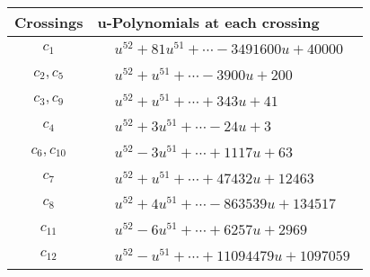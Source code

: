 \documentclass[1p]{elsarticle_modified}
\theoremstyle{definition}
\begin{document}
\begin{tabular}{m{50pt}|m{274pt}}
Crossings & \hspace{64pt}u-Polynomials at each crossing \\
\hline $$\begin{aligned}c_{1}\end{aligned}$$&$\begin{aligned}
&u^{52}+81 u^{51}+\cdots-3491600 u+40000
\end{aligned}$\\
\hline $$\begin{aligned}c_{2},c_{5}\end{aligned}$$&$\begin{aligned}
&u^{52}+u^{51}+\cdots-3900 u+200
\end{aligned}$\\
\hline $$\begin{aligned}c_{3},c_{9}\end{aligned}$$&$\begin{aligned}
&u^{52}+u^{51}+\cdots+343 u+41
\end{aligned}$\\
\hline $$\begin{aligned}c_{4}\end{aligned}$$&$\begin{aligned}
&u^{52}+3 u^{51}+\cdots-24 u+3
\end{aligned}$\\
\hline $$\begin{aligned}c_{6},c_{10}\end{aligned}$$&$\begin{aligned}
&u^{52}-3 u^{51}+\cdots+1117 u+63
\end{aligned}$\\
\hline $$\begin{aligned}c_{7}\end{aligned}$$&$\begin{aligned}
&u^{52}+u^{51}+\cdots+47432 u+12463
\end{aligned}$\\
\hline $$\begin{aligned}c_{8}\end{aligned}$$&$\begin{aligned}
&u^{52}+4 u^{51}+\cdots-863539 u+134517
\end{aligned}$\\
\hline $$\begin{aligned}c_{11}\end{aligned}$$&$\begin{aligned}
&u^{52}-6 u^{51}+\cdots+6257 u+2969
\end{aligned}$\\
\hline $$\begin{aligned}c_{12}\end{aligned}$$&$\begin{aligned}
&u^{52}- u^{51}+\cdots+11094479 u+1097059
\end{aligned}$\\
\hline
\end{tabular}\\~\\
\end{document}
